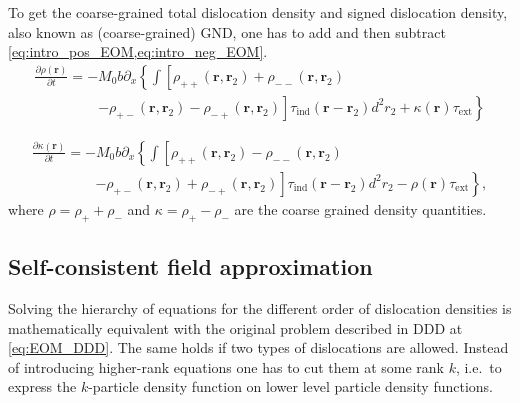 To get the coarse-grained total dislocation density and signed dislocation density, also known as (coarse-grained) GND, one has to add and then subtract \cref{eq:intro_pos_EOM,eq:intro_neg_EOM}. 
\begin{multline} \label{eq:CDD_rho_wlog}
\frac{{\partial \rho \left( {\mathbf{r}} \right)}}{{\partial t}} =  - {M_0}b{\partial _x}\left\{ \int \left[ {{
   \rho _{ +  + }}\left( {{\mathbf{r}},{{\mathbf{r}}_2}} \right) + {\rho _{ -  - }}\left( {{\mathbf{r}},{{\mathbf{r}}_2}} \right)} \right. \right. \\
  \left. \phantom{\int {\left[ {\left( {\mathbf{r}} \right)} \right]} } {\left.  - {\rho _{ +  - }}\left( {{\mathbf{r}},{{\mathbf{r}}_2}} \right) - {\rho _{ -  + }}\left( {{\mathbf{r}},{{\mathbf{r}}_2}} \right) \right]{\tau _{{\text{ind}}}}\left( {{\mathbf{r}} - {{\mathbf{r}}_2}} \right) d^2r_2}  + \kappa \left( {\mathbf{r}} \right){\tau _{{\text{ext}}}} \right\}
\end{multline}

\begin{multline} \label{eq:CDD_kappa_wlog}
\frac{{\partial \kappa \left( {\mathbf{r}} \right)}}{{\partial t}} =  - {M_0}b{\partial _x}\left\{ \int \left[ {{
  \rho _{ +  + }}\left( {{\mathbf{r}},{{\mathbf{r}}_2}} \right) - {\rho _{ -  - }}\left( {{\mathbf{r}},{{\mathbf{r}}_2}} \right)} \right. \right. \\
  \left. \phantom{\int {\left[ {\left( {\mathbf{r}} \right)} \right]} } {\left.  - {\rho _{ +  - }}\left( {{\mathbf{r}},{{\mathbf{r}}_2}} \right) + {\rho _{ -  + }}\left( {{\mathbf{r}},{{\mathbf{r}}_2}} \right) \right]{\tau _{{\text{ind}}}}\left( {{\mathbf{r}} - {{\mathbf{r}}_2}} \right) d^2r_2}  - \rho \left( {\mathbf{r}} \right){\tau _{{\text{ext}}}} \right\},
\end{multline}
where $\rho  = {\rho _ + } + {\rho _ - }$ and $\kappa  = {\rho _ + } - {\rho _ - }$ are the coarse grained density quantities.

\subsection{Self-consistent field approximation} \label{sec:disloc_sim_self_consistent}
Solving the hierarchy of equations for the different order of dislocation densities is mathematically equivalent with the original problem described in DDD at \cref{eq:EOM_DDD}. The same holds if two types of dislocations are allowed. Instead of introducing higher-rank equations one has to cut them at some rank $k$, i.e.\ to express the $k$-particle density function on lower level particle density functions.

